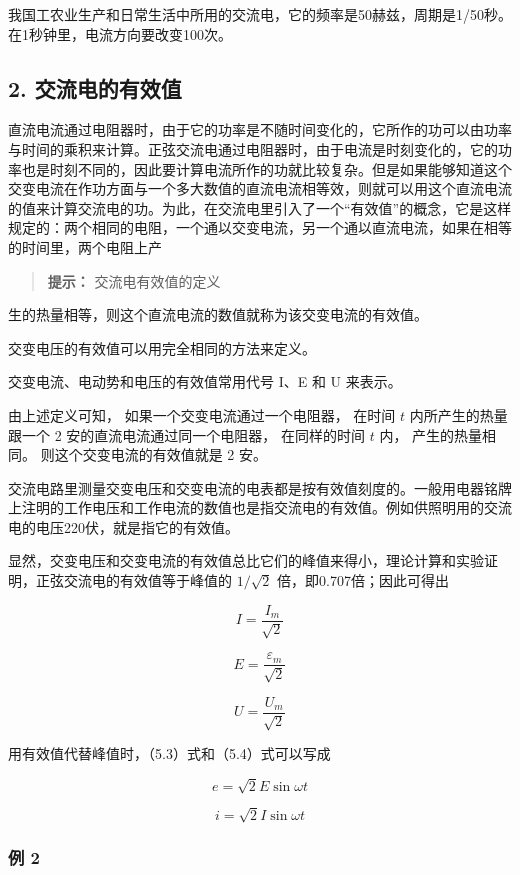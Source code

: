 我国工农业生产和日常生活中所用的交流电，它的频率是50赫兹，周期是1/50秒。在1秒钟里，电流方向要改变100次。

\subsection{2.
交流电的有效值}\label{ux4ea4ux6d41ux7535ux7684ux6709ux6548ux503c}

直流电流通过电阻器时，由于它的功率是不随时间变化的，它所作的功可以由功率与时间的乘积来计算。正弦交流电通过电阻器时，由于电流是时刻变化的，它的功率也是时刻不同的，因此要计算电流所作的功就比较复杂。但是如果能够知道这个交变电流在作功方面与一个多大数值的直流电流相等效，则就可以用这个直流电流的值来计算交流电的功。为此，在交流电里引入了一个``有效值''的概念，它是这样规定的：两个相同的电阻，一个通以交变电流，另一个通以直流电流，如果在相等的时间里，两个电阻上产

\begin{quote}
\textbf{提示：} 交流电有效值的定义
\end{quote}

生的热量相等，则这个直流电流的数值就称为该交变电流的有效值。

交变电压的有效值可以用完全相同的方法来定义。

交变电流、电动势和电压的有效值常用代号 I、E 和 U 来表示。

由上述定义可知， 如果一个交变电流通过一个电阻器， 在时间 \(t\)
内所产生的热量跟一个 2 安的直流电流通过同一个电阻器， 在同样的时间 \(t\)
内， 产生的热量相同。 则这个交变电流的有效值就是 2 安。

交流电路里测量交变电压和交变电流的电表都是按有效值刻度的。一般用电器铭牌上注明的工作电压和工作电流的数值也是指交流电的有效值。例如供照明用的交流电的电压220伏，就是指它的有效值。

显然，交变电压和交变电流的有效值总比它们的峰值来得小，理论计算和实验证明，正弦交流电的有效值等于峰值的
\(1 / \sqrt{2}\) 倍，即0.707倍；因此可得出

\[
I = \frac{I_{m}}{\sqrt{2}} \tag{5.7}
\]

\[
E = \frac{\varepsilon_{m}}{\sqrt{2}} \tag{5.8}
\]

\[
U = \frac{U_{m}}{\sqrt{2}} \tag{5.9}
\]

用有效值代替峰值时，（5.3）式和（5.4）式可以写成

\[
e = \sqrt{2} E \sin \omega t
\]

\[
i = \sqrt{2} I \sin \omega t
\]

\subsubsection{例 2}\label{ux4f8b-2-4}

